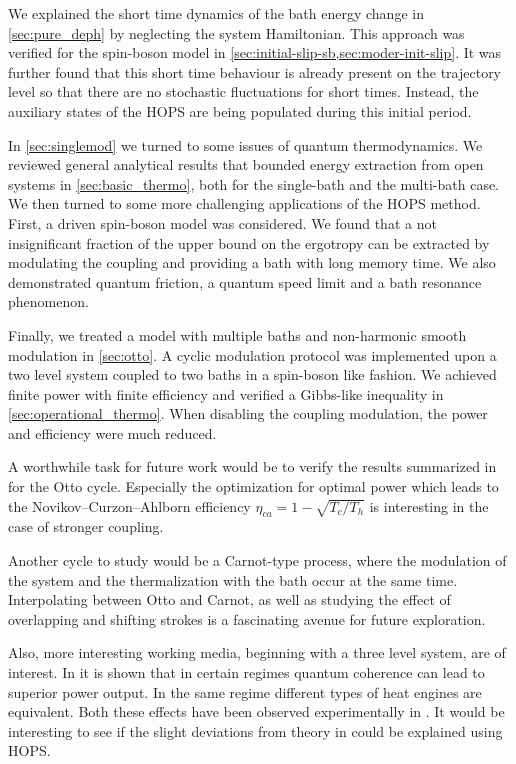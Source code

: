 We explained the short time dynamics of the bath energy change in
\cref{sec:pure_deph} by neglecting the system Hamiltonian. This
approach was verified for the spin-boson model in
\cref{sec:initial-slip-sb,sec:moder-init-slip}. It was further found
that this short time behaviour is already present on the trajectory
level so that there are no stochastic fluctuations for short
times. Instead, the auxiliary states of the HOPS are being populated
during this initial period.

In \cref{sec:singlemod} we turned to some issues of quantum
thermodynamics. We reviewed general analytical results that bounded
energy extraction from open systems in \cref{sec:basic_thermo}, both
for the single-bath and the multi-bath case. We then turned to some
more challenging applications of the HOPS method. First, a driven
spin-boson model was considered. We found that a not insignificant
fraction of the upper bound on the ergotropy can be extracted by
modulating the coupling and providing a bath with long memory time. We
also demonstrated quantum friction, a quantum speed limit and a bath
resonance phenomenon.

Finally, we treated a model with multiple baths and non-harmonic
smooth modulation in \cref{sec:otto}. A cyclic modulation protocol was
implemented upon a two level system coupled to two baths in a
spin-boson like fashion. We achieved finite power with finite
efficiency and verified a Gibbs-like inequality in
\cref{sec:operational_thermo}. When disabling the coupling modulation,
the power and efficiency were much reduced.

A worthwhile task for future work would be to verify the results
summarized in  for the Otto cycle. Especially the
optimization for optimal power which leads to the
Novikov–Curzon–Ahlborn efficiency \(η_{ca}=1-\sqrt{T_{c}/T_{h}}\) is
interesting in the case of stronger coupling.

Another cycle to study would be a Carnot-type process, where the
modulation of the system and the thermalization with the bath occur at
the same time. Interpolating between Otto and Carnot, as well as
studying the effect of overlapping and shifting strokes is a
fascinating avenue for future exploration.

Also, more interesting working media, beginning with a three level
system, are of interest. In  it is shown that in
certain regimes quantum coherence can lead to superior power
output. In the same regime different types of heat engines are
equivalent. Both these effects have been observed experimentally in
. It would be interesting to see if the slight
deviations from theory in \cite{Klatzow2019Mar} could be explained
using HOPS.

